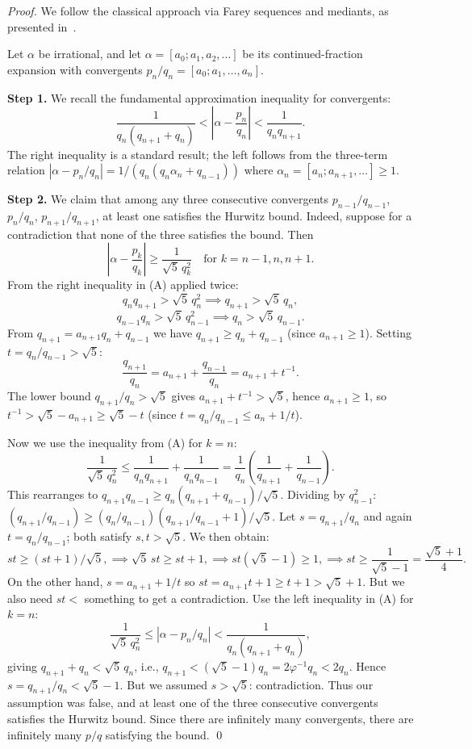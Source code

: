\begin{proof}
We follow the classical approach via Farey sequences and
mediants, as presented in~\cite{hardy_wright}.

Let $\alpha$ be irrational, and let
$\alpha = [a_0; a_1, a_2, \ldots]$ be its
continued-fraction expansion with convergents
$p_n/q_n = [a_0; a_1, \ldots, a_n]$.

\textbf{Step 1.} We recall the fundamental
approximation inequality for convergents:
\[
  \frac{1}{q_n(q_{n+1}+q_n)}
  < \left|\alpha - \frac{p_n}{q_n}\right|
  < \frac{1}{q_n q_{n+1}}.
  \tag{A}
\]
The right inequality is a standard result; the left
follows from the three-term relation
$|\alpha - p_n/q_n| = 1/(q_n(q_n \alpha_n + q_{n-1}))$
where $\alpha_n = [a_n; a_{n+1}, \ldots] \geq 1$.

\textbf{Step 2.} We claim that among any three
consecutive convergents $p_{n-1}/q_{n-1}$,
$p_n/q_n$, $p_{n+1}/q_{n+1}$, at least one satisfies
the Hurwitz bound.
Indeed, suppose for a contradiction that none of the
three satisfies the bound.
Then
\[
  \left|\alpha - \frac{p_k}{q_k}\right| \geq \frac{1}{\sqrt{5}\,q_k^2}
  \quad\text{for }k = n-1, n, n+1.
\]
From the right inequality in (A) applied twice:
\[
  q_n q_{n+1} > \sqrt{5}\,q_n^2
  \implies q_{n+1} > \sqrt{5}\,q_n,
\]
\[
  q_{n-1} q_n > \sqrt{5}\,q_{n-1}^2
  \implies q_n > \sqrt{5}\,q_{n-1}.
\]
From $q_{n+1} = a_{n+1} q_n + q_{n-1}$ we have
$q_{n+1} \geq q_n + q_{n-1}$
(since $a_{n+1} \geq 1$).
Setting $t = q_n/q_{n-1} > \sqrt{5}$:
\[
  \frac{q_{n+1}}{q_n} = a_{n+1} + \frac{q_{n-1}}{q_n}
    = a_{n+1} + t^{-1}.
\]
The lower bound $q_{n+1}/q_n > \sqrt{5}$ gives
$a_{n+1} + t^{-1} > \sqrt{5}$, hence $a_{n+1} \geq 1$,
so $t^{-1} > \sqrt{5} - a_{n+1} \geq \sqrt{5} - t$
(since $t = q_n/q_{n-1} \leq a_n + 1/t$).

Now we use the inequality from (A) for $k=n$:
\[
  \frac{1}{\sqrt{5}\,q_n^2} \leq \frac{1}{q_n q_{n+1}} + \frac{1}{q_n q_{n-1}}
  = \frac{1}{q_n}\left(\frac{1}{q_{n+1}} + \frac{1}{q_{n-1}}\right).
\]
This rearranges to
$q_{n+1}q_{n-1} \geq q_n(q_{n+1} + q_{n-1})/\sqrt{5}$.
Dividing by $q_{n-1}^2$:
$(q_{n+1}/q_{n-1}) \geq (q_n/q_{n-1})(q_{n+1}/q_{n-1}+1)/\sqrt{5}$.
Let $s = q_{n+1}/q_n$ and again $t = q_n/q_{n-1}$; both
satisfy $s, t > \sqrt{5}$.
We then obtain:
\[
  st \geq (st + 1)/\sqrt{5},
  \implies \sqrt{5}\,st \geq st + 1,
  \implies st(\sqrt{5}-1) \geq 1,
  \implies st \geq \frac{1}{\sqrt{5}-1} = \frac{\sqrt{5}+1}{4}.
\]
On the other hand, $s = a_{n+1} + 1/t$ so
$st = a_{n+1}t + 1 \geq t + 1 > \sqrt{5} + 1$.
But we also need $st < $ something to get a contradiction.
Use the left inequality in (A) for $k=n$:
\[
  \frac{1}{\sqrt{5}\,q_n^2} \leq |\alpha - p_n/q_n|
  < \frac{1}{q_n(q_{n+1}+q_n)},
\]
giving $q_{n+1} + q_n < \sqrt{5}\,q_n$, i.e.,
$q_{n+1} < (\sqrt{5}-1)q_n = 2\varphi^{-1}q_n < 2 q_n$.
Hence $s = q_{n+1}/q_n < \sqrt{5}-1$.
But we assumed $s > \sqrt{5}$: contradiction.
Thus our assumption was false, and at least one of the
three consecutive convergents satisfies the Hurwitz
bound.
Since there are infinitely many convergents, there are
infinitely many $p/q$ satisfying the bound.
\qed
\end{proof}

